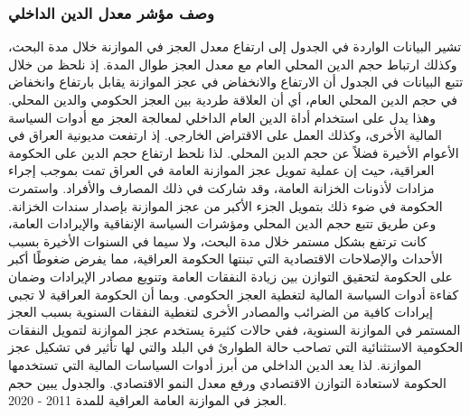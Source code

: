 \documentclass[10pt,a4paper]{report}
\begin{document}
\begin{doublespacing}
\subsubsection{وصف مؤشر معدل الدين الداخلي}
تشير البيانات الواردة في الجدول إلى ارتفاع معدل العجز في الموازنة خلال مدة البحث، وكذلك ارتباط حجم الدين المحلي العام مع معدل العجز طوال المدة. إذ نلحظ من خلال تتبع البيانات في الجدول أن الارتفاع والانخفاض في عجز الموازنة يقابل بارتفاع وانخفاض في حجم الدين المحلي العام، أي أن العلاقة طردية بين العجز الحكومي والدين المحلي. وهذا يدل على استخدام أداة الدين العام الداخلي لمعالجة العجز مع أدوات السياسة المالية الأخرى، وكذلك العمل على الاقتراض الخارجي. إذ ارتفعت مديونية العراق في الأعوام الأخيرة فضلاً عن حجم الدين المحلي. لذا نلحظ ارتفاع حجم الدين على الحكومة العراقية، حيث إن عملية تمويل عجز الموازنة العامة في العراق تمت بموجب إجراء مزادات لأذونات الخزانة العامة، وقد شاركت في ذلك المصارف والأفراد. واستمرت الحكومة في ضوء ذلك بتمويل الجزء الأكبر من عجز الموازنة بإصدار سندات الخزانة. وعن طريق تتبع حجم الدين المحلي ومؤشرات السياسة الإنفاقية والإيرادات العامة، كانت ترتفع بشكل مستمر خلال مدة البحث، ولا سيما في السنوات الأخيرة بسبب الأحداث والإصلاحات الاقتصادية التي تبنتها الحكومة العراقية، مما يفرض ضغوطًا أكبر على الحكومة لتحقيق التوازن بين زيادة النفقات العامة وتنويع مصادر الإيرادات وضمان كفاءة أدوات السياسة المالية لتغطية العجز الحكومي. وبما أن الحكومة العراقية لا تجبي إيرادات كافية من الضرائب والمصادر الأخرى لتغطية النفقات السنوية بسبب العجز المستمر في الموازنة السنوية، ففي حالات كثيرة يستخدم عجز الموازنة لتمويل النفقات الحكومية الاستثنائية التي تصاحب حالة الطوارئ في البلد والتي لها تأثير في تشكيل عجز الموازنة. لذا يعد الدين الداخلي من أبرز أدوات السياسات المالية التي تستخدمها الحكومة لاستعادة التوازن الاقتصادي ورفع معدل النمو الاقتصادي. والجدول يبين حجم العجز في الموازنة العامة العراقية للمدة 2011 - 2020.
\begin{table}[H]
	\captionsetup{font=Large}  %
	\fontsize{14}{12}\selectfont
	\centering
	\caption{معدل الدين الداخلي في العراق للمدة (2010-2021) (مليار/دينار)}
	\label{tab:7.3}
\end{table}
\end{doublespacing}
\end{document}
